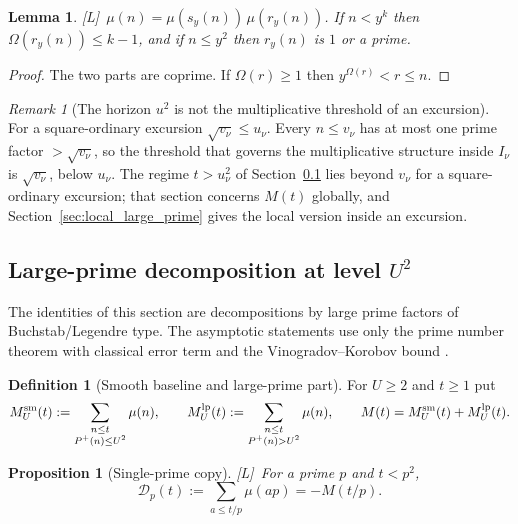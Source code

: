 \documentclass[11pt,reqno]{amsart}
\numberwithin{equation}{section}
\theoremstyle{plain}
\newtheorem{proposition}[theorem]{Proposition}
\newtheorem{lemma}[theorem]{Lemma}
\theoremstyle{definition}
\newtheorem{definition}[theorem]{Definition}
\theoremstyle{remark}
\newtheorem{remark}[theorem]{Remark}
\newcommand{\Pp}{P^{+}}
\newcommand{\tagL}{\textup{[L]}}
\begin{document}
\begin{lemma}
\label{lem:rough_part}
\tagL\ $\mu(n)=\mu(s_y(n))\,\mu(r_y(n))$. If $n<y^k$ then $\Omega(r_y(n))\le k-1$,
and if $n\le y^2$ then $r_y(n)$ is $1$ or a prime.
\end{lemma}

\begin{proof}
The two parts are coprime. If $\Omega(r)\ge1$ then $y^{\Omega(r)}<r\le n$.
\end{proof}

\begin{remark}[The horizon $u^2$ is not the multiplicative threshold of an excursion]
\label{rem:horizon_inactive}
For a square-ordinary excursion $\sqrt{v_\nu}\le u_\nu$. Every $n\le v_\nu$
has at most one prime factor $>\sqrt{v_\nu}$, so the threshold that governs
the multiplicative structure inside $I_\nu$ is $\sqrt{v_\nu}$, below
$u_\nu$. The regime $t>u_\nu^2$ of Section~\ref{sec:prime_copy_propagation}
lies beyond $v_\nu$ for a square-ordinary excursion; that section concerns
$M(t)$ globally, and Section~\ref{sec:local_large_prime} gives the local
version inside an excursion.
\end{remark}


\subsection{Large-prime decomposition at level \texorpdfstring{$U^2$}{U squared}}
\label{sec:prime_copy_propagation}

The identities of this section are decompositions by large prime factors of
Buchstab/Legendre type. The asymptotic statements use only the prime number
theorem with classical error term and the Vinogradov--Korobov bound
\cite{MontgomeryVaughan2007,Walfisz1963}.

\begin{definition}[Smooth baseline and large-prime part]
\label{def:baseline_channel}
For $U\ge2$ and $t\ge1$ put
\begin{equation}
\label{eq:baseline_channel_def}
  M^{\rm sm}_U(t):=\sum_{\substack{n\le t\\ \Pp(n)\le U^2}}\mu(n),\qquad
  M^{\rm lp}_U(t):=\sum_{\substack{n\le t\\ \Pp(n)>U^2}}\mu(n),\qquad
  M(t)=M^{\rm sm}_U(t)+M^{\rm lp}_U(t).
\end{equation}
\end{definition}

\begin{proposition}[Single-prime copy]
\label{prop:single_prime_copy}
\tagL\ For a prime $p$ and $t<p^2$,
\begin{equation}
\label{eq:single-prime-copy}
  \mathcal D_p(t):=\sum_{a\le t/p}\mu(ap)=-M(t/p).
\end{equation}
\end{proposition}
\end{document}
